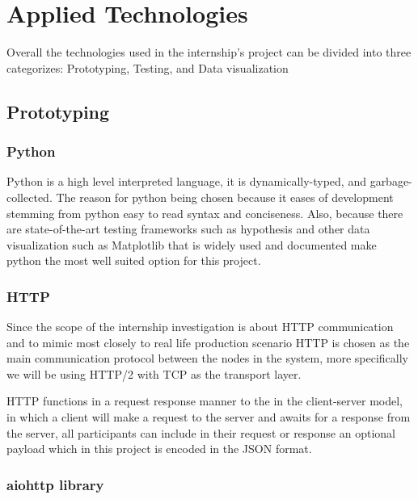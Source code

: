 \chapter{\centering Applied Technologies}

Overall the technologies used in the internship's project can be divided into
three categorizes: Prototyping, Testing, and Data visualization

\section{Prototyping}

\subsection{Python}
Python is a high level interpreted language, it is dynamically-typed, and garbage-collected.
The reason for python being chosen because it eases of development stemming from 
python easy to read syntax and conciseness. Also, because there are state-of-the-art
testing frameworks such as hypothesis and other data visualization such as Matplotlib
that is widely used and documented make python the most well suited option for 
this project.


\subsection{HTTP}
Since the scope of the internship investigation is about HTTP communication and to mimic 
most closely to real life production scenario HTTP is chosen as the main communication 
protocol between the nodes in the system, more specifically we will be using HTTP/2 with 
TCP as the transport layer.

HTTP functions in a request response manner to the in the client-server model, 
in which a client will make a request to the server and awaits for a response 
from the server, all participants can include in their request or response 
an optional payload which in this project is encoded in the JSON format.

\subsection{aiohttp library}

